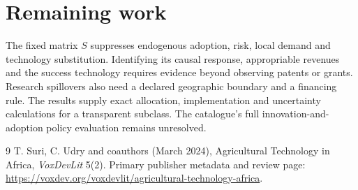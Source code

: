 \documentclass[11pt]{article}
\begin{document}
\section*{Remaining work}
The fixed matrix $S$ suppresses endogenous adoption, risk, local demand and technology substitution. Identifying its causal response, appropriable revenues and the success technology requires evidence beyond observing patents or grants. Research spillovers also need a declared geographic boundary and a financing rule. The results supply exact allocation, implementation and uncertainty calculations for a transparent subclass. The catalogue's full innovation-and-adoption policy evaluation remains unresolved.

\begin{thebibliography}{9}
 T. Suri, C. Udry and coauthors (March 2024), Agricultural Technology in Africa, \emph{VoxDevLit} 5(2). Primary publisher metadata and review page:
\url{https://voxdev.org/voxdevlit/agricultural-technology-africa}.
\end{thebibliography}
\end{document}
